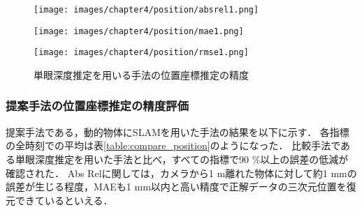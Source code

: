 \begin{figure}[H]
	\centering
	\begin{minipage}[t]{0.45\linewidth}
		\centering
		\texttt{[image: images/chapter4/position/absrel1.png]}
		\label{fig:absrel1}
	\end{minipage}
	\begin{minipage}[t]{0.45\linewidth}
		\centering
		\texttt{[image: images/chapter4/position/mae1.png]}
		\label{fig:mae1}
	\end{minipage}
	\begin{minipage}[t]{0.45\linewidth}
		\centering
		\texttt{[image: images/chapter4/position/rmse1.png]}
		\label{fig:rmse1}
	\end{minipage}
	\caption{単眼深度推定を用いる手法の位置座標推定の精度}
	\label{fig:monodepth_position_result}
\end{figure}

\newpage
\subsubsection{提案手法の位置座標推定の精度評価}\label{3d_position_eval_slam}
提案手法である，動的物体にSLAMを用いた手法の結果を以下に示す．
各指標の全時刻での平均は表\ref{table:compare_position}のようになった．
比較手法である単眼深度推定を用いた手法と比べ，すべての指標で90 \%以上の誤差の低減が確認された．
Abs Relに関しては，カメラから1 m離れた物体に対して約1 mmの誤差が生じる程度，MAEも1 mm以内と高い精度で正解データの三次元位置を復元できているといえる．

